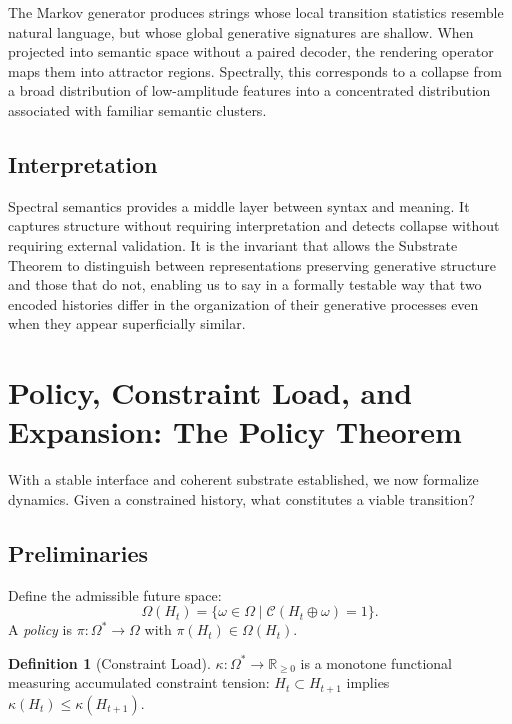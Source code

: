 \documentclass[12pt, a4paper]{article}
\theoremstyle{plain}
\theoremstyle{definition}
\newtheorem{definition}[theorem]{Definition}
\theoremstyle{remark}
\begin{document}
The Markov generator produces strings whose local transition statistics resemble natural language, but whose global generative signatures are shallow. When projected into semantic space without a paired decoder, the rendering operator maps them into attractor regions. Spectrally, this corresponds to a collapse from a broad distribution of low-amplitude features into a concentrated distribution associated with familiar semantic clusters.

\subsection{Interpretation}

Spectral semantics provides a middle layer between syntax and meaning. It captures structure without requiring interpretation and detects collapse without requiring external validation. It is the invariant that allows the Substrate Theorem to distinguish between representations preserving generative structure and those that do not, enabling us to say in a formally testable way that two encoded histories differ in the organization of their generative processes even when they appear superficially similar.

\section{Policy, Constraint Load, and Expansion: The Policy Theorem}

With a stable interface and coherent substrate established, we now formalize dynamics. Given a constrained history, what constitutes a viable transition?

\subsection{Preliminaries}

Define the admissible future space:
\[
\Omega(H_t) = \{ \omega \in \Omega \mid \mathcal{C}(H_t \oplus \omega) = 1 \}.
\]
A \emph{policy} is $\pi : \Omega^* \to \Omega$ with $\pi(H_t) \in \Omega(H_t)$.

\begin{definition}[Constraint Load]
$\kappa : \Omega^* \to \mathbb{R}_{\geq 0}$ is a monotone functional measuring accumulated constraint tension: $H_t \subset H_{t+1}$ implies $\kappa(H_t) \leq \kappa(H_{t+1})$.
\end{definition}
\end{document}
